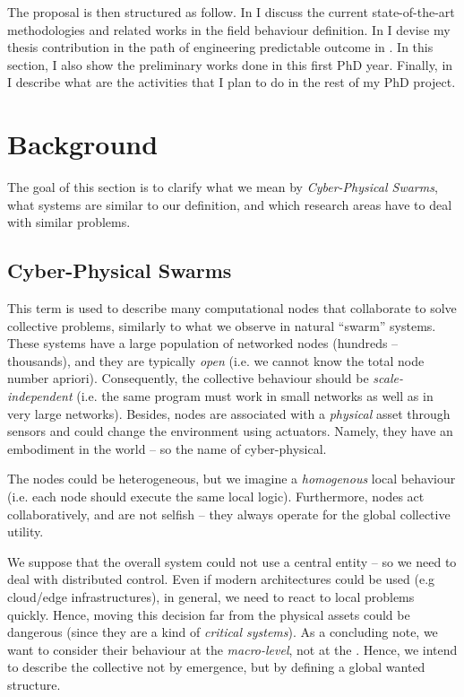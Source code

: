 \documentclass[11pt]{article}
\begin{document}
The proposal is then structured as follow. In  I discuss the current state-of-the-art methodologies and related works in the field \cpsw{} behaviour definition.
%
In  I devise my thesis contribution in the path of engineering predictable outcome in \cpsw{}. In this section, I also show the preliminary works done in this first PhD year.
%
Finally, in  I describe what are the activities that I plan to do in the rest of my PhD project.

\section{Background} \label{background}
The goal of this section is to clarify what we mean by \textit{Cyber-Physical Swarms}, what systems are similar to our definition, and which research areas have to deal with similar problems.
\subsection{Cyber-Physical Swarms}
This term is used to describe many computational nodes that collaborate to solve collective problems, similarly to what we observe in natural ``swarm'' systems.
%
These systems have a large population of networked nodes (hundreds -- thousands), and they are typically \textit{open} (i.e. we cannot know the total node number apriori). Consequently, the collective behaviour should be \textit{scale-independent} (i.e. the same program must work in small networks as well as in very large networks).
%
Besides, nodes are associated with a \textit{physical} asset through sensors and could change the environment using actuators. Namely, they have an embodiment in the world -- so the name of cyber-physical. 

The nodes could be heterogeneous, but we imagine a \emph{homogenous} local behaviour (i.e. each node should execute the same local logic). Furthermore, nodes act collaboratively, and are not selfish -- they always operate for the global collective utility.

We suppose that the overall system could not use a central entity -- so we need to deal with distributed control. Even if modern architectures could be used (e.g cloud/edge infrastructures), in general, we need to react to local problems quickly. Hence, moving this decision far from the physical assets could be dangerous (since they are a kind of \emph{critical systems}).
%
As a concluding note, we want to consider their behaviour at the \textit{macro-level}, not at the . Hence, we intend to describe the collective not by emergence, but by defining a global wanted structure.
\end{document}
